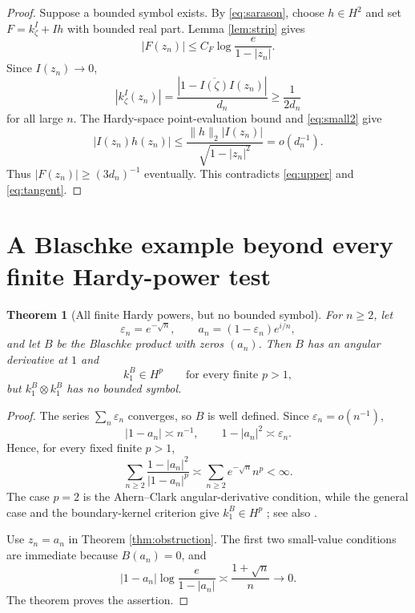 \documentclass[11pt]{article}
\newtheorem{theorem}{Theorem}
\begin{document}
\begin{proof}
Suppose a bounded symbol exists.  By \eqref{eq:sarason}, choose $h\in H^2$
and set $F=k_\zeta^I+Ih$ with bounded real part.  Lemma \ref{lem:strip}
gives
\begin{equation}
 |F(z_n)|\le C_F\log\frac{e}{1-|z_n|}.
 \label{eq:upper}
\end{equation}
Since $I(z_n)\to0$,
\[
 |k_\zeta^I(z_n)|
 =\frac{|1-\overline{I(\zeta)}I(z_n)|}{d_n}
 \ge \frac{1}{2d_n}
\]
for all large $n$.  The Hardy-space point-evaluation bound and
\eqref{eq:small2} give
\[
 |I(z_n)h(z_n)|
 \le \frac{\|h\|_2|I(z_n)|}{\sqrt{1-|z_n|^2}}
 =o(d_n^{-1}).
\]
Thus $|F(z_n)|\ge(3d_n)^{-1}$ eventually.  This contradicts
\eqref{eq:upper} and \eqref{eq:tangent}.
\end{proof}

\section{A Blaschke example beyond every finite Hardy-power test}

\begin{theorem}[All finite Hardy powers, but no bounded symbol]
\label{thm:blaschke}
For $n\ge2$, let
\[
 \varepsilon_n=e^{-\sqrt n},\qquad
 a_n=(1-\varepsilon_n)e^{i/n},
\]
and let $B$ be the Blaschke product with zeros $(a_n)$.  Then $B$ has an
angular derivative at $1$ and
\[
 k_1^B\in H^p\qquad\text{for every finite }p>1,
\]
but $k_1^B\otimes k_1^B$ has no bounded symbol.
\end{theorem}

\begin{proof}
The series $\sum_n\varepsilon_n$ converges, so $B$ is well defined.  Since
$\varepsilon_n=o(n^{-1})$,
\[
 |1-a_n|\asymp n^{-1},\qquad 1-|a_n|^2\asymp\varepsilon_n.
\]
Hence, for every fixed finite $p>1$,
\begin{equation}
 \sum_{n\ge2}\frac{1-|a_n|^2}{|1-a_n|^p}
 \asymp \sum_{n\ge2} e^{-\sqrt n}n^p<\infty.
 \label{eq:HpB}
\end{equation}
The case $p=2$ is the Ahern--Clark angular-derivative condition, while the
general case and the boundary-kernel criterion give $k_1^B\in H^p$
\cite{AhernClark,Cohn}; see also \cite[Section 2.2]{BCFMT}.

Use $z_n=a_n$ in Theorem \ref{thm:obstruction}.  The first two small-value
conditions are immediate because $B(a_n)=0$, and
\[
 |1-a_n|\log\frac{e}{1-|a_n|}
 \asymp \frac{1+\sqrt n}{n}\longrightarrow0.
\]
The theorem proves the assertion.
\end{proof}
\end{document}
